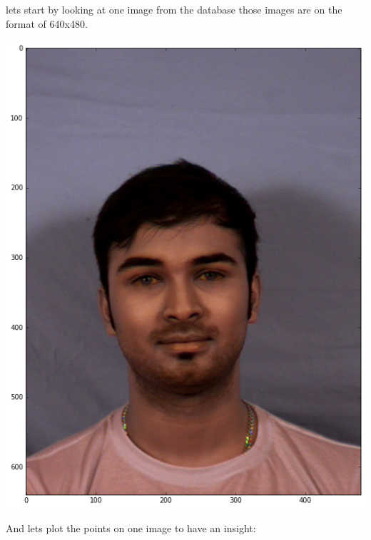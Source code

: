 \documentclass[11pt]{article}
\begin{document}
lets start by looking at one image from the database those images are on the
format of 640x480. 
\begin{center}
\includegraphics[width=.9\linewidth]{./images/example1.png}
\end{center}

And lets plot the points on one image to have an insight: 
\end{document}
